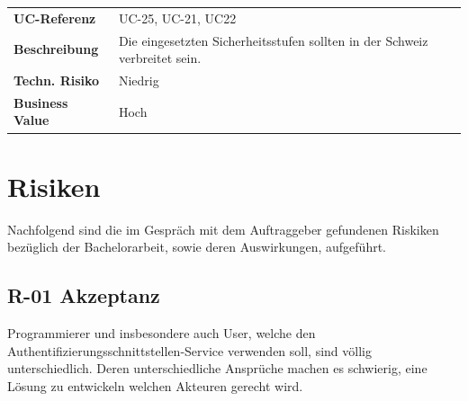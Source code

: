 \begin{longtable}[c]{@{}ll@{}}
\toprule
\begin{minipage}[t]{0.20\columnwidth}\raggedright\strut
\textbf{UC-Referenz}
\strut\end{minipage} &
\begin{minipage}[t]{0.74\columnwidth}\raggedright\strut
UC-25, UC-21, UC22
\strut\end{minipage}\tabularnewline
\begin{minipage}[t]{0.20\columnwidth}\raggedright\strut
\textbf{Beschreibung}
\strut\end{minipage} &
\begin{minipage}[t]{0.74\columnwidth}\raggedright\strut
Die eingesetzten Sicherheitsstufen sollten in der Schweiz verbreitet
sein.
\strut\end{minipage}\tabularnewline
\begin{minipage}[t]{0.20\columnwidth}\raggedright\strut
\textbf{Techn. Risiko}
\strut\end{minipage} &
\begin{minipage}[t]{0.74\columnwidth}\raggedright\strut
Niedrig
\strut\end{minipage}\tabularnewline
\begin{minipage}[t]{0.20\columnwidth}\raggedright\strut
\textbf{Business Value}
\strut\end{minipage} &
\begin{minipage}[t]{0.74\columnwidth}\raggedright\strut
Hoch
\strut\end{minipage}\tabularnewline
\bottomrule
\end{longtable}

\newpage

\newpage

\section{Risiken}\label{risiken}

Nachfolgend sind die im Gespräch mit dem Auftraggeber gefundenen
Riskiken bezüglich der Bachelorarbeit, sowie deren Auswirkungen,
aufgeführt.

\subsection{R-01 Akzeptanz}\label{r-01-akzeptanz}

Programmierer und insbesondere auch User, welche den
Authentifizierungsschnittstellen-Service verwenden soll, sind völlig
unterschiedlich. Deren unterschiedliche Ansprüche machen es schwierig,
eine Lösung zu entwickeln welchen Akteuren gerecht wird.

